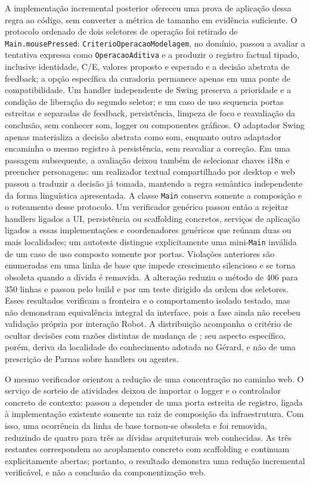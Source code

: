 \documentclass[preprint,12pt,authoryear]{elsarticle}
\newcommand{\gerard}{Gérard\xspace}
\begin{document}
A implementação incremental posterior ofereceu uma prova de aplicação dessa regra ao código, sem converter a métrica de tamanho em evidência suficiente. O protocolo ordenado de dois seletores de operação foi retirado de \texttt{Main.mousePressed}: \texttt{CriterioOperacaoModelagem}, no domínio, passou a avaliar a tentativa expressa como \texttt{OperacaoAditiva} e a produzir o registro factual tipado, inclusive identidade, C/E, valores proposto e esperado e a decisão abstrata de feedback; a opção específica da curadoria permanece apenas em uma ponte de compatibilidade. Um handler independente de Swing preserva a prioridade e a condição de liberação do segundo seletor; e um caso de uso sequencia portas estreitas e separadas de feedback, persistência, limpeza de foco e reavaliação da conclusão, sem conhecer som, logger ou componentes gráficos. O adaptador Swing apenas materializa a decisão abstrata como som, enquanto outro adaptador encaminha o mesmo registro à persistência, sem reavaliar a correção. Em uma passagem subsequente, a avaliação deixou também de selecionar chaves i18n e preencher personagens: um realizador textual compartilhado por desktop e web passou a traduzir a decisão já tomada, mantendo a regra semântica independente da forma linguística apresentada. A classe \texttt{Main} conserva somente a composição e o roteamento desse protocolo. Um verificador genérico passou então a rejeitar handlers ligados a UI, persistência ou scaffolding concretos, serviços de aplicação ligados a essas implementações e coordenadores genéricos que reúnam duas ou mais localidades; um autoteste distingue explicitamente uma mini-\texttt{Main} inválida de um caso de uso composto somente por portas. Violações anteriores são enumeradas em uma linha de base que impede crescimento silencioso e se torna obsoleta quando a dívida é removida. A alteração reduziu o método de 406 para 350 linhas e passou pelo build e por um teste dirigido da ordem dos seletores. Esses resultados verificam a fronteira e o comportamento isolado testado, mas não demonstram equivalência integral da interface, pois a fase ainda não recebeu validação própria por interação Robot. A distribuição acompanha o critério de ocultar decisões com razões distintas de mudança de \citet{parnas1972criteria}; seu aspecto específico, porém, deriva da localidade do conhecimento adotada no \gerard{}, e não de uma prescrição de Parnas sobre handlers ou agentes.

O mesmo verificador orientou a redução de uma concentração no caminho web. O serviço de sorteio de atividades deixou de importar o logger e o controlador concreto de contexto: passou a depender de uma porta estreita de registro, ligada à implementação existente somente na raiz de composição da infraestrutura. Com isso, uma ocorrência da linha de base tornou-se obsoleta e foi removida, reduzindo de quatro para três as dívidas arquiteturais web conhecidas. As três restantes correspondem ao acoplamento concreto com scaffolding e continuam explicitamente abertas; portanto, o resultado demonstra uma redução incremental verificável, e não a conclusão da componentização web.
\end{document}
